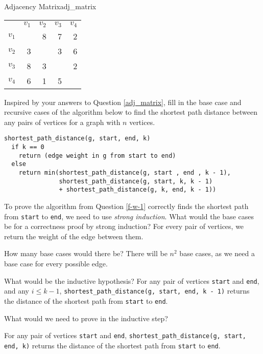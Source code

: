 \documentclass{tufte-handout}
\begin{document}
\begin{questions}
\begin{model}{Adjacency Matrix}{adj_matrix}
\begin{tabular}{ l r r r r }
      & $v_1$ & $v_2$ & $v_3$ & $v_4$ \\
$v_1$ &       & 8     & 7     & 2 \\
$v_2$ & 3     &       & 3     & 6 \\
$v_3$ & 8     & 3     &       & 2 \\
$v_4$ & 6     & 1     & 5     &   \\
\end{tabular}
\label{adj_matrix}
\end{model}

\item Inspired by your answers to Question \ref{adj_matrix}, fill in the base case and recursive cases of the algorithm below to find the shortest path distance between any pairs of vertices for a graph with $n$ vertices. \label{f-w-1}
{\color{red}
\begin{verbatim}
shortest_path_distance(g, start, end, k)
  if k == 0
    return (edge weight in g from start to end)
  else 
    return min(shortest_path_distance(g, start , end , k - 1),
               shortest_path_distance(g, start, k, k - 1) 
               + shortest_path_distance(g, k, end, k - 1))
\end{verbatim}
}

\item To prove the algorithm from Question \ref{f-w-1} correctly finds the shortest path from \verb|start| to \verb|end|, we need to use \emph{strong induction}. What would the base cases be for a correctness proof by strong induction?  {\color{red} For every pair of vertices, we return the weight of the edge between them.}

\item How many base cases would there be?  {\color{red} There will be $n^2$ base cases, as we need a base case for every possible edge.}

\item What would be the inductive hypothesis? {\color{red} 
For any pair of vertices \verb|start| and \verb|end|, and any $i \le k - 1$, \verb|shortest_path_distance(g, start, end, k - 1)| returns the distance of the shortest path from \verb|start| to \verb|end|.}

\item What would we need to prove in the inductive step?

{\color{red} 
For any pair of vertices \verb|start| and \verb|end|, \verb|shortest_path_distance(g, start, end, k)| returns the distance of the shortest path from \verb|start| to \verb|end|.}


\end{questions}
\end{document}
